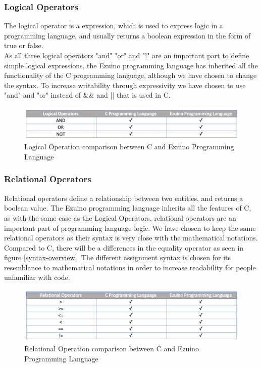 \subsubsection*{Logical Operators}
The logical operator is a expression, which is used to express logic in a programming language, and usually returns a boolean expression in the form of true or false. \\
As all three logical operators "and" "or" and "!" are an important part to define simple logical expressions, the Ezuino programming language has inherited all the functionality of the C programming language, although we have chosen to change the syntax. To increase writability through expressivity we have chosen to use "and" and "or" instead of && and || that is used in C.\\
\begin{figure}[H]
\centering
\includegraphics[scale=0.60]{figures/language_features/langf03.png}
\caption{Logical Operation comparison between C and Ezuino Programming Language}
\label{lf03}
\end{figure}
\subsubsection*{Relational Operators}
Relational operators define a relationship between two entities, and returns a boolean value.  
The Ezuino programming language inherits all the features of C, as with the same case as the Logical Operators, relational operators are an important part of programming language logic. We have chosen to keep the same relational operators as their syntax is very close with the mathematical notations. Compared to C, there will be a differences in the equality operator as seen in figure \ref{syntax-overview}. The different assignment syntax is chosen for its resemblance to mathematical notations in order to increase readability for people unfamiliar with code. 
\begin{figure}[H]
\centering
\includegraphics[scale=0.60]{figures/language_features/langf04.png}
\caption{Relational Operation comparison between C and Ezuino Programming Language}
\label{lf04}
\end{figure}

